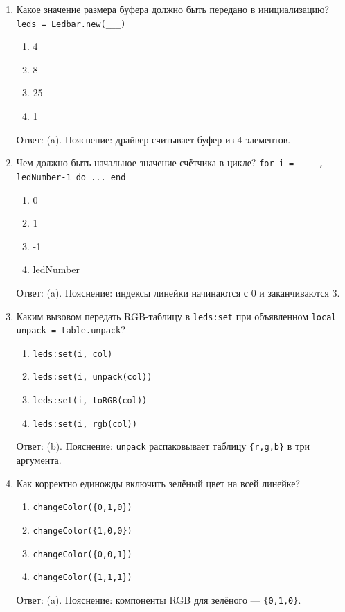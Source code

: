 \begin{enumerate}
  \item Какое значение размера буфера должно быть передано в инициализацию? \verb|leds = Ledbar.new(___)|
  \begin{enumerate}[label=(\alph*)]
    \item 4 \item 8 \item 25 \item 1
  \end{enumerate}
  Ответ: (a). Пояснение: драйвер считывает буфер из 4 элементов.

  \item Чем должно быть начальное значение счётчика в цикле? \verb|for i = ____, ledNumber-1 do ... end|
  \begin{enumerate}[label=(\alph*)]
    \item 0 \item 1 \item -1 \item ledNumber
  \end{enumerate}
  Ответ: (a). Пояснение: индексы линейки начинаются с 0 и заканчиваются 3.

  \item Каким вызовом передать RGB-таблицу в \verb|leds:set| при объявленном \verb|local unpack = table.unpack|?
  \begin{enumerate}[label=(\alph*)]
    \item \verb|leds:set(i, col)| \item \verb|leds:set(i, unpack(col))| \item \verb|leds:set(i, toRGB(col))| \item \verb|leds:set(i, rgb(col))|
  \end{enumerate}
  Ответ: (b). Пояснение: \verb|unpack| распаковывает таблицу \verb|{r,g,b}| в три аргумента.

  \item Как корректно единожды включить зелёный цвет на всей линейке?
  \begin{enumerate}[label=(\alph*)]
    \item \verb|changeColor({0,1,0})| \item \verb|changeColor({1,0,0})| \item \verb|changeColor({0,0,1})| \item \verb|changeColor({1,1,1})|
  \end{enumerate}
  Ответ: (a). Пояснение: компоненты RGB для зелёного — \verb|{0,1,0}|.


\end{enumerate}
